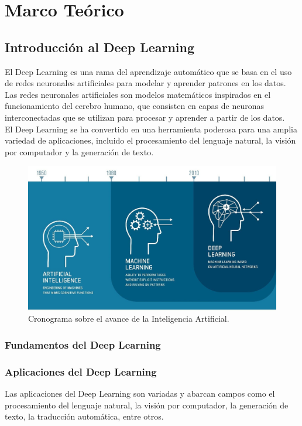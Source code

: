 \documentclass{article}
\begin{document}
\newpage

\section{Marco Teórico}
\subsection{Introducción al Deep Learning}
El Deep Learning es una rama del aprendizaje automático que se basa en el uso de redes neuronales artificiales para modelar y aprender patrones en los datos.
Las redes neuronales artificiales son modelos matemáticos inspirados en el funcionamiento del cerebro humano, que consisten en capas de neuronas interconectadas que se utilizan para procesar y aprender a partir de los datos. \\

El Deep Learning se ha convertido en una herramienta poderosa para una amplia variedad de aplicaciones, incluido el procesamiento del lenguaje natural, la visión por computador y la generación de texto.

\begin{figure}[H]
    \centering
    \includegraphics[scale=0.2]{history.png}
    \caption{Cronograma sobre el avance de la Inteligencia Artificial. \cite{tjk2024deep}}
\end{figure}

\subsubsection{Fundamentos del Deep Learning}

\subsubsection{Aplicaciones del Deep Learning}
Las aplicaciones del Deep Learning son variadas y abarcan campos como el procesamiento del lenguaje natural, la visión por computador, la generación de texto, la traducción automática, entre otros.
\end{document}
